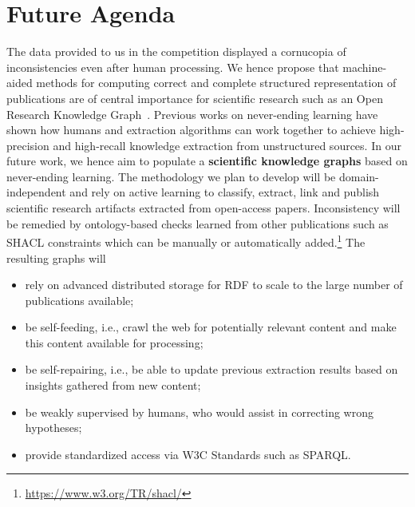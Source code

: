 \documentclass[runningheads]{llncs}
\begin{document}
\section{Future Agenda}
The data provided to us in the competition displayed a cornucopia of inconsistencies even after human processing. We hence propose that machine-aided methods for computing correct and complete structured representation of publications are of central importance for scientific research such as an Open Research Knowledge Graph~\cite{DBLP:journals/corr/abs-1901-10816}. Previous works on never-ending learning have shown how humans and extraction algorithms can work together to achieve high-precision and high-recall knowledge extraction from unstructured sources. In our future work, we hence aim to
populate a \textbf{scientific knowledge graphs} based on never-ending learning. The methodology we plan to develop will be domain-independent and rely on active learning to classify, extract, link and publish scientific research artifacts extracted from open-access papers.  %
Inconsistency will be remedied by ontology-based checks learned from other publications such as SHACL constraints which can be manually or automatically added.\footnote{\url{https://www.w3.org/TR/shacl/}}
The resulting graphs will
\begin{itemize}
    \item rely on advanced distributed storage for RDF to scale to the large number of publications available;
    \item be self-feeding, i.e., crawl the web for potentially relevant content and make this content available for processing;
    \item be self-repairing, i.e., be able to update previous extraction results based on insights gathered from new content;
    \item be weakly supervised by humans, who would assist in correcting wrong hypotheses;
    \item provide standardized access via W3C Standards such as SPARQL.
\end{itemize}
\end{document}
